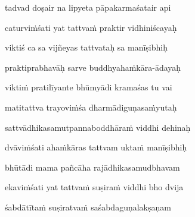 tadvad doṣair na lipyeta pāpakarmaśatair api \veg\dontdisplaylinenum


caturvi\.mśati yat tattva\.m praktir vidhiniścayaḥ\thinspace{\dandab} \dontdisplaylinenum

viktiś ca sa vijñeyas tattvataḥ sa manīṣibhiḥ \veg\dontdisplaylinenum

praktiprabhavāḥ sarve buddhyaha\.mkāra-ādayaḥ\thinspace{\dandab} \dontdisplaylinenum

vikti\.m pratilīyante bhūmyādi kramaśas tu vai \veg\dontdisplaylinenum


matitattva trayovi\.mśa dharmādiguṇasa\.myutaḥ\thinspace{\dandab} \dontdisplaylinenum

sattvādhikasamutpannaboddhāra\.m viddhi dehinaḥ \veg\dontdisplaylinenum


dvāvi\.mśati aha\.mkāras tattvam ukta\.m manīṣibhiḥ\thinspace{\dandab} \dontdisplaylinenum

bhūtādi mama pañcāha rajādhikasamudbhavam \veg\dontdisplaylinenum


ekavi\.mśati yat tattva\.m suṣira\.m viddhi bho dvija\thinspace{\dandab} \dontdisplaylinenum

śabdātīta\.m suṣiratva\.m saśabdaguṇalakṣaṇam \veg\dontdisplaylinenum


